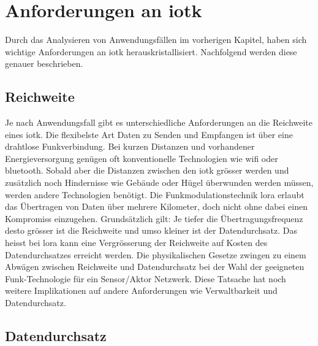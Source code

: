 \chapter{Anforderungen an \gls{iotk}}

Durch das Analysieren von Anwendungsfällen im vorherigen Kapitel, haben sich wichtige Anforderungen an \gls{iotk} herauskristallisiert. Nachfolgend werden diese genauer beschrieben.

\section{Reichweite}

Je nach Anwendungsfall gibt es unterschiedliche Anforderungen an die Reichweite eines \gls{iotk}. Die flexibelste Art Daten zu Senden und Empfangen ist über eine drahtlose Funkverbindung. Bei kurzen Distanzen und vorhandener Energieversorgung genügen oft konventionelle Technologien wie \gls{wifi} oder \gls{bluetooth}. Sobald aber die Distanzen zwischen den \gls{iotk} grösser werden und zusätzlich noch Hindernisse wie Gebäude oder Hügel überwunden werden müssen, werden andere Technologien benötigt. Die Funkmodulationstechnik \gls{lora} erlaubt das Übertragen von Daten über mehrere Kilometer, doch nicht ohne dabei einen Kompromiss einzugehen. Grundsätzlich gilt: Je tiefer die Übertragungsfrequenz desto grösser ist die Reichweite und umso kleiner ist der Datendurchsatz. Das heisst bei \gls{lora} kann eine Vergrösserung der Reichweite auf Kosten des Datendurchsatzes erreicht werden. Die physikalischen Gesetze zwingen zu einem Abwägen zwischen Reichweite und Datendurchsatz bei der Wahl der geeigneten Funk-Technologie für ein Sensor/Aktor Netzwerk. Diese Tatsache hat noch weitere Implikationen auf andere Anforderungen wie Verwaltbarkeit und Datendurchsatz.

\section{Datendurchsatz}


